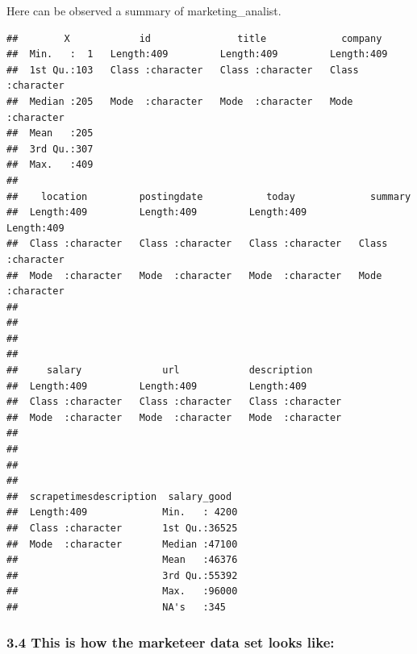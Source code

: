 \documentclass[
]{article}
\begin{document}
Here can be observed a summary of marketing\_analist.

\begin{verbatim}
##        X            id               title             company         
##  Min.   :  1   Length:409         Length:409         Length:409        
##  1st Qu.:103   Class :character   Class :character   Class :character  
##  Median :205   Mode  :character   Mode  :character   Mode  :character  
##  Mean   :205                                                           
##  3rd Qu.:307                                                           
##  Max.   :409                                                           
##                                                                        
##    location         postingdate           today             summary         
##  Length:409         Length:409         Length:409         Length:409        
##  Class :character   Class :character   Class :character   Class :character  
##  Mode  :character   Mode  :character   Mode  :character   Mode  :character  
##                                                                             
##                                                                             
##                                                                             
##                                                                             
##     salary              url            description       
##  Length:409         Length:409         Length:409        
##  Class :character   Class :character   Class :character  
##  Mode  :character   Mode  :character   Mode  :character  
##                                                          
##                                                          
##                                                          
##                                                          
##  scrapetimesdescription  salary_good   
##  Length:409             Min.   : 4200  
##  Class :character       1st Qu.:36525  
##  Mode  :character       Median :47100  
##                         Mean   :46376  
##                         3rd Qu.:55392  
##                         Max.   :96000  
##                         NA's   :345
\end{verbatim}

\hypertarget{this-is-how-the-marketeer-data-set-looks-like}{%
\subsubsection{3.4 This is how the marketeer data set looks
like:}\label{this-is-how-the-marketeer-data-set-looks-like}}
\end{document}
